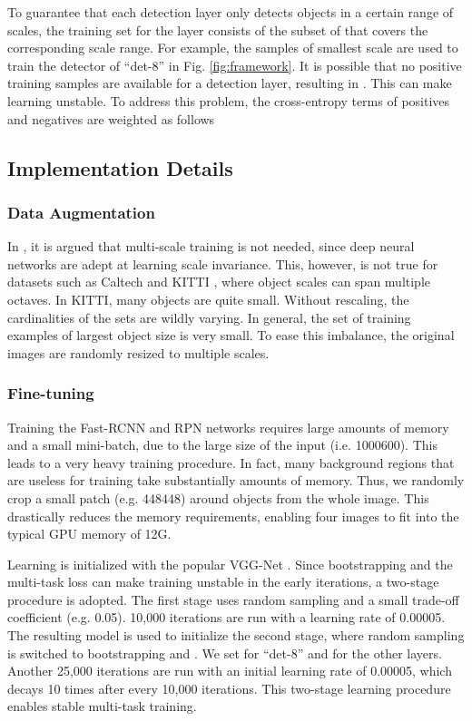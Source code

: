 \documentclass[runningheads]{llncs}
\begin{document}
To guarantee that each detection layer only detects objects in a
certain range of scales, the training set for the layer
consists of the subset of  that covers the corresponding scale range.
For example, the
samples of smallest scale are used to train the detector of ``det-8''
in Fig. \ref{fig:framework}. It is possible that no positive training samples
are available for a detection layer, resulting in .
This can make learning unstable. To address this problem,
the cross-entropy terms of positives and negatives are weighted as follows



\subsection{Implementation Details}
\label{subsec:rpn details}

\subsubsection{Data Augmentation}
In \cite{DBLP:conf/iccv/Girshick15,DBLP:conf/eccv/HeZR014}, it is argued
that multi-scale training is not needed, since deep neural networks are
adept at learning scale invariance. This, however, is not true for datasets
such as Caltech \cite{DBLP:journals/pami/DollarWSP12} and
KITTI \cite{DBLP:conf/cvpr/GeigerLU12}, where object scales can span multiple
octaves. In KITTI, many objects are quite small. Without rescaling, the
cardinalities of the sets  are wildly
varying. In general, the set of training examples of largest object size
is very small. To ease this imbalance, the original images are randomly resized
to multiple scales.

\subsubsection{Fine-tuning}
Training the Fast-RCNN \cite{DBLP:conf/iccv/Girshick15} and RPN \cite{DBLP:conf/nips/shaoqing15fasterRcnn} networks requires large amounts of memory and a small mini-batch, due to the large size of the input (i.e. 1000600). This leads to a very heavy training procedure. In fact, many background regions that are useless for training take substantially amounts of memory. Thus, we randomly crop a small patch (e.g. 448448) around objects from the whole image. This drastically reduces the memory requirements, enabling four images to fit into the typical GPU memory of 12G.

Learning is initialized with the popular
VGG-Net \cite{DBLP:journals/corr/SimonyanZ14a}. Since bootstrapping
and the multi-task loss can make training unstable in the early iterations,
a two-stage procedure is adopted. The first stage uses random
sampling and a small trade-off coefficient  (e.g. 0.05).
10,000 iterations are run with a learning rate of 0.00005.
The resulting model is used to initialize the second stage,
where random sampling is switched to bootstrapping and
. We set  for ``det-8'' and  for the
other layers. Another 25,000 iterations are run with an initial learning rate of 0.00005, which decays 10 times after every 10,000 iterations. This two-stage learning procedure enables stable multi-task training.
\end{document}
